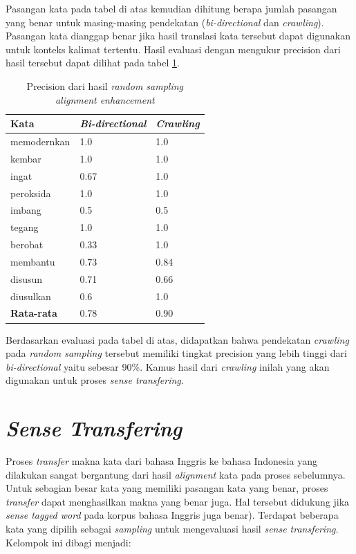 Pasangan kata pada tabel di atas kemudian dihitung berapa jumlah pasangan yang benar untuk masing-masing pendekatan (\textit{bi-directional} dan \textit{crawling}). Pasangan kata dianggap benar jika hasil translasi kata tersebut dapat digunakan untuk konteks kalimat tertentu. Hasil evaluasi dengan mengukur precision dari hasil tersebut dapat dilihat pada tabel \ref{table:enhancement-precision}.


\begin{table}
	\centering
	\caption{Precision dari hasil \textit{random sampling alignment enhancement}}
	\label{table:enhancement-precision}
	\begin{tabular}{|p{2.5cm}|p{3cm}|p{3cm}|}
		\hline
		\textbf{Kata} & \textbf{\textit{Bi-directional}} & \textbf{\textit{Crawling}}
		\\ \hline
		memodernkan & 1.0 & 1.0 \\ \hline
		kembar & 1.0 & 1.0 \\ \hline
		ingat & 0.67 & 1.0 \\ \hline
		peroksida & 1.0 & 1.0 \\ \hline
		imbang & 0.5 & 0.5 \\ \hline
		tegang & 1.0 & 1.0 \\ \hline
		berobat & 0.33 & 1.0 \\ \hline
		membantu & 0.73 & 0.84 \\ \hline
		disusun & 0.71 & 0.66 \\ \hline
		diusulkan & 0.6 & 1.0 \\ \hline	
		\hline
		\textbf{Rata-rata} & 0.78 & 0.90 \\ \hline
	\end{tabular}
\end{table}

Berdasarkan evaluasi pada tabel di atas, didapatkan bahwa pendekatan \textit{crawling} pada \textit{random sampling} tersebut memiliki tingkat precision yang lebih tinggi dari \textit{bi-directional} yaitu sebesar 90\%. Kamus hasil dari \textit{crawling} inilah yang akan digunakan untuk proses \textit{sense transfering}.

\section{\textit{Sense Transfering}}

Proses \textit{transfer} makna kata dari bahasa Inggris ke bahasa Indonesia yang dilakukan sangat bergantung dari hasil \textit{alignment} kata pada proses sebelumnya. Untuk sebagian besar kata yang memiliki pasangan kata yang benar, proses \textit{transfer} dapat menghasilkan makna yang benar juga. Hal tersebut didukung jika \textit{sense tagged word} pada korpus bahasa Inggris juga benar). Terdapat beberapa kata yang dipilih sebagai \textit{sampling} untuk mengevaluasi hasil \textit{sense transfering}. Kelompok ini dibagi menjadi:

